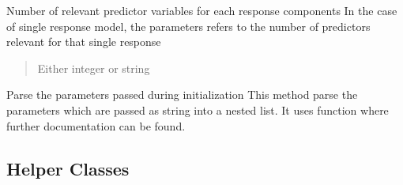 \documentclass[letterpaper,10pt,english]{sphinxmanual}
\begin{document}
\begin{fulllineitems}
\begin{fulllineitems}
\end{fulllineitems}


\begin{fulllineitems}
\label{\detokenize{Classes:pysimrel.Simrel.n_relpred}}
\pysigstartsignatures
{}
\pysigstopsignatures
\sphinxAtStartPar
Number of relevant predictor variables for each response components
In the case of single response model, the parameters refers to the
number of predictors relevant for that single response
\begin{quote}\begin{description}
\sphinxAtStartPar
Either integer or string

\end{description}\end{quote}

\end{fulllineitems}


\begin{fulllineitems}
\label{\detokenize{Classes:pysimrel.Simrel.parse_parameters}}
\pysigstartsignatures
{}
\pysigstopsignatures
\sphinxAtStartPar
Parse the parameters passed during initialization
This method parse the parameters which are passed as string into
a nested list. It uses  function where further
documentation can be found.

\end{fulllineitems}


\end{fulllineitems}



\subsection{Helper Classes}
\label{\detokenize{Classes:helper-classes}}
\end{document}
